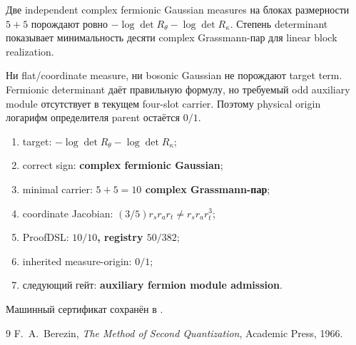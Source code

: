 \begin{theorem}
Две independent complex fermionic Gaussian measures на блоках размерности
$5+5$ порождают ровно
$-\log\det R_\theta-\log\det R_\kappa$. Степень determinant показывает
минимальность десяти complex Grassmann-пар для linear block realization.
\end{theorem}

\begin{nogocriterion}
Ни flat/coordinate measure, ни bosonic Gaussian не порождают target term.
Fermionic determinant даёт правильную формулу, но требуемый odd auxiliary
module отсутствует в текущем four-slot carrier. Поэтому physical origin
логарифм определителя parent остаётся $0/1$.
\end{nogocriterion}

\begin{protocol}\begin{enumerate}
\item target: \textbf{$-\log\det R_\theta-\log\det R_\kappa$};
\item correct sign: \textbf{complex fermionic Gaussian};
\item minimal carrier: \textbf{$5+5=10$ complex Grassmann-пар};
\item coordinate Jacobian: \textbf{$(3/5)r_sr_ar_t\neq r_sr_ar_t^3$};
\item ProofDSL: \textbf{$10/10$, registry $50/382$};
\item inherited measure-origin: \textbf{$0/1$};
\item следующий гейт: \textbf{auxiliary fermion module admission}.
\end{enumerate}\end{protocol}

Машинный сертификат сохранён в
.

\begin{thebibliography}{9}
F.~A.~Berezin,
\emph{The Method of Second Quantization},
Academic Press, 1966.
\end{thebibliography}